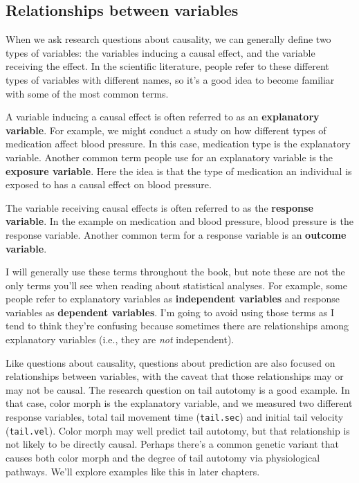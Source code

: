 \documentclass[
]{book}
\begin{document}
\subsection{Relationships between variables}\label{relationships-between-variables}

When we ask research questions about causality, we can generally define two types of variables: the variables inducing a causal effect, and the variable receiving the effect. In the scientific literature, people refer to these different types of variables with different names, so it's a good idea to become familiar with some of the most common terms.

A variable inducing a causal effect is often referred to as an \textbf{explanatory variable}. For example, we might conduct a study on how different types of medication affect blood pressure. In this case, medication type is the explanatory variable. Another common term people use for an explanatory variable is the \textbf{exposure variable}. Here the idea is that the type of medication an individual is exposed to has a causal effect on blood pressure.

The variable receiving causal effects is often referred to as the \textbf{response variable}. In the example on medication and blood pressure, blood pressure is the response variable. Another common term for a response variable is an \textbf{outcome variable}.

I will generally use these terms throughout the book, but note these are not the only terms you'll see when reading about statistical analyses. For example, some people refer to explanatory variables as \textbf{independent variables} and response variables as \textbf{dependent variables}. I'm going to avoid using those terms as I tend to think they're confusing because sometimes there are relationships among explanatory variables (i.e., they are \emph{not} independent).

Like questions about causality, questions about prediction are also focused on relationships between variables, with the caveat that those relationships may or may not be causal. The research question on tail autotomy is a good example. In that case, color morph is the explanatory variable, and we measured two different response variables, total tail movement time (\texttt{tail.sec}) and initial tail velocity (\texttt{tail.vel}). Color morph may well predict tail autotomy, but that relationship is not likely to be directly causal. Perhaps there's a common genetic variant that causes both color morph and the degree of tail autotomy via physiological pathways. We'll explore examples like this in later chapters.
\end{document}
